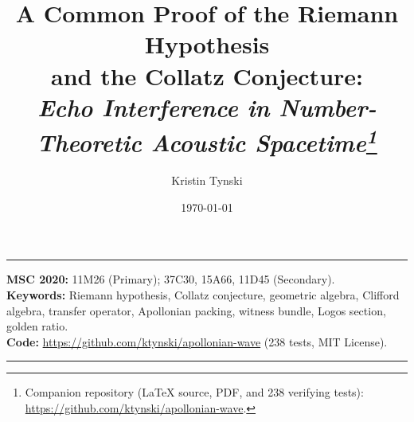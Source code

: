 \documentclass[11pt,a4paper]{article}
\title{A Common Proof of the Riemann Hypothesis\\
and the Collatz Conjecture:\\[2pt]
\large\itshape Echo Interference in Number-Theoretic Acoustic Spacetime\thanks{%
Companion repository (LaTeX source, PDF, and 238 verifying tests):
\url{https://github.com/ktynski/apollonian-wave}.}}
\author{Kristin Tynski}
\date{\today}
\theoremstyle{plain}
\theoremstyle{definition}
\theoremstyle{remark}
\numberwithin{equation}{section}
\begin{document}
\thispagestyle{empty}
\maketitle

\vspace{-1.0em}
\begin{center}
{\color{ruleColor}\rule{0.55\textwidth}{0.5pt}}
\end{center}

\begin{center}
\footnotesize
\textbf{MSC 2020:} 11M26 (Primary); 37C30, 15A66, 11D45 (Secondary).\\
\textbf{Keywords:} Riemann hypothesis, Collatz conjecture, geometric
algebra, Clifford algebra, transfer operator, Apollonian packing,
witness bundle, Logos section, golden ratio.\\
\textbf{Code:} \url{https://github.com/ktynski/apollonian-wave}
(238 tests, MIT License).
\end{center}

\vspace{0.4em}
\begin{center}
{\color{ruleColor}\rule{0.55\textwidth}{0.5pt}}
\end{center}
\vspace{-0.3em}
\end{document}
